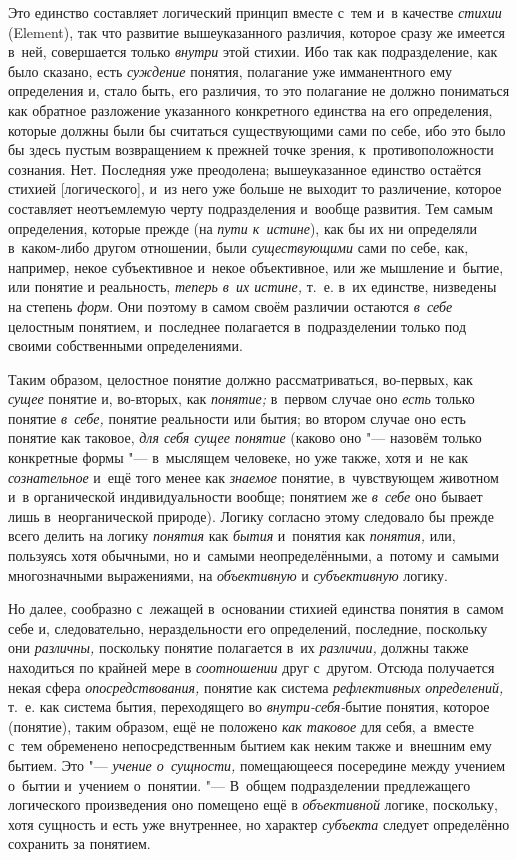 Это единство составляет логический принцип вместе с~тем и~в качестве
{\em стихии} (Ele\-ment), так что развитие вышеуказанного
различия, которое сразу же имеется в~ней, совершается только
{\em внутри} этой стихии. Ибо так как подразделение,
как было сказано, есть {\em суждение} понятия,
полагание уже имманентного ему определения и, стало быть, его различия, то
это полагание не должно пониматься как обратное разложение указанного
конкретного единства на его определения, которые должны были бы считаться
существующими сами по себе, ибо это было бы здесь пустым возвращением к
прежней точке зрения, к~противоположности сознания. Нет. Последняя уже
преодолена; вышеуказанное единство остаётся стихией [логического], и~из
него уже больше не выходит то различение, которое составляет неотъемлемую
черту подразделения и~вообще развития. Тем самым определения, которые
прежде (на {\em пути к~истине}), как бы их ни
определяли в~каком-либо другом отношении, были
{\em существующими} сами по себе, как, например, некое
субъективное и~некое объективное, или же мышление и~бытие, или понятие и
реальность, {\em теперь в~их истине,} т.~е. в~их
единстве, низведены на степень {\em форм}. Они поэтому
в самом своём различии остаются {\em в~себе} целостным
понятием, и~последнее полагается в~подразделении только под своими
собственными определениями.

Таким образом, целостное понятие должно рассматриваться, во-первых, как
{\em сущее} понятие и, во-вторых, как {\em понятие;} в~первом случае оно
{\em есть} только понятие {\em в~себе,} понятие реальности или бытия;
во втором случае оно есть понятие как таковое, {\em для себя сущее понятие}
(каково оно "--- назовём только конкретные формы "--- в~мыслящем человеке,
но уже также, хотя и~не как {\em сознательное} и~ещё того менее как
{\em знаемое} понятие, в~чувствующем животном и~в
органической индивидуальности вообще; понятием же
{\em в~себе} оно бывает лишь в~неорганической природе).
Логику согласно этому следовало бы прежде всего делить на логику
{\em понятия} как {\em бытия} и~понятия как {\em понятия,} или, пользуясь
хотя обычными, но и~самыми неопределёнными, а~потому и~самыми многозначными
выражениями, на {\em объективную} и {\em субъективную} логику.

Но далее, сообразно с~лежащей в~основании стихией единства понятия в~самом
себе и, следовательно, нераздельности его определений, последние, поскольку
они {\em различны,} поскольку понятие полагается в~их
{\em различии,} должны также находиться по крайней мере
в {\em соотношении} друг с~другом. Отсюда получается
некая сфера {\em опосредствования,} понятие как система
{\em рефлективных определений,} т.~е. как система
бытия, переходящего во {\em внутри-себя-}бытие понятия,
которое (понятие), таким образом, ещё не положено
{\em как таковое} для себя, а~вместе с~тем обременено
непосредственным бытием как неким также и~внешним ему бытием. Это
"--- {\em учение о~сущности,} помещающееся посередине
между учением о~бытии и~учением о~понятии. "--- В~общем подразделении
предлежащего логического произведения оно помещено ещё в
{\em объективной} логике, поскольку, хотя сущность и
есть уже внутреннее, но характер {\em субъекта} следует
определённо сохранить за понятием.

